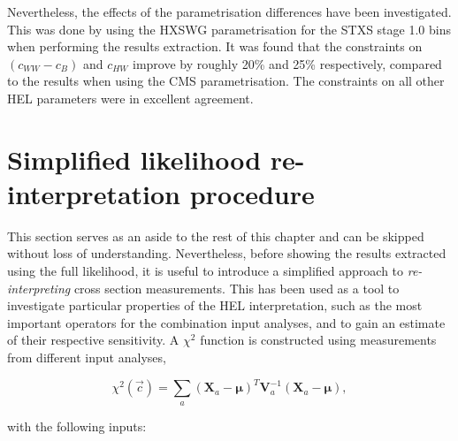 Nevertheless, the effects of the parametrisation differences have been investigated. This was done by using the HXSWG parametrisation for the STXS stage 1.0 bins when performing the results extraction. It was found that the constraints on $(c_{WW}-c_B)$ and $c_{HW}$ improve by roughly 20\% and 25\% respectively, compared to the results when using the CMS parametrisation. The constraints on all other HEL parameters were in excellent agreement.

\section{Simplified likelihood re-interpretation procedure}\label{sec:eft_simplified}
This section serves as an aside to the rest of this chapter and can be skipped without loss of understanding. Nevertheless, before showing the results extracted using the full likelihood, it is useful to introduce a simplified approach to \textit{re-interpreting} cross section measurements. This has been used as a tool to investigate particular properties of the HEL interpretation, such as the most important operators for the combination input analyses, and to gain an estimate of their respective sensitivity. A $\chi^2$ function is constructed using measurements from different input analyses,

\begin{equation}
    \chi^2(\vec{c}) = \sum_a (\mathbf{X}_a-\pmb{\mu})^T \mathbf{V}_a^{-1} (\mathbf{X}_a-\pmb{\mu}),
\end{equation}

\noindent
with the following inputs:

